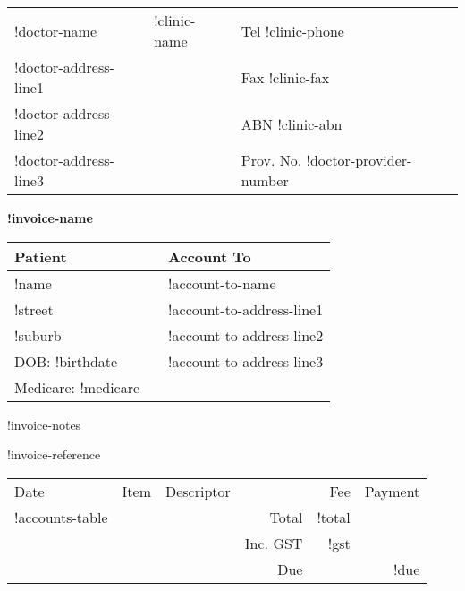 \documentclass[12pt]{article}
\begin{document}
\begin{center}
\begin{tabular}{p{}>{\centering}p{}<{\centering}p{}<{\raggedleft}}
!doctor-name & {\Large !clinic-name } & Tel !clinic-phone \\
!doctor-address-line1 &  & Fax !clinic-fax \\
!doctor-address-line2 & & ABN !clinic-abn \\
!doctor-address-line3 & & Prov. No. !doctor-provider-number\\ 
\hline
\end{tabular}

\vspace{7mm}

{ \Large \textbf{!invoice-name} }

\end{center}

\vspace{7mm}

\begin{tabular}{lp{5mm}l} 
Patient & & Account To \\ \midrule
!name & & !account-to-name\\
!street & & !account-to-address-line1 \\
!suburb & & !account-to-address-line2 \\
DOB: !birthdate &  & !account-to-address-line3 \\
Medicare:   !medicare & &   \\
\end{tabular}

\vspace{3mm}

!invoice-notes

!invoice-reference

\vspace{3mm}

\begin{tabularx}{\textwidth}{llp{55mm}rrr}
Date & Item & Descriptor & & Fee & Payment \\ \cmidrule(l){1-6}
!accounts-table
\cmidrule(l){5-6}
& & & Total & !total  & \\
& & & Inc. GST & !gst & \\ \cmidrule(l){5-6}
& & & Due & & !due \\

\end{tabularx}
\end{document}
